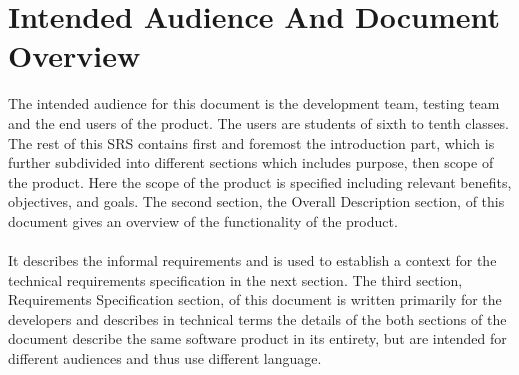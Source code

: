 \documentclass[12pt]{report}
\begin{document}
\section{Intended Audience And Document Overview}

The intended audience for this document is the development team, testing team and the end users of the product. The users are students of sixth to tenth classes. The rest of this SRS contains first and foremost the introduction part, which is further subdivided into different sections which includes purpose, then scope of the product. Here the scope of the product is specified including relevant benefits, objectives, and goals. The second section, the Overall Description section, of this document gives an overview of the functionality of the product. \\
\\
It describes the informal requirements and is used to establish a context for the technical requirements specification in the next section. The third section, Requirements Specification section, of this document is written primarily for the developers and describes in technical terms the details of the both sections of the document describe the same software product in its entirety, but are intended for different audiences and thus use different language.
\pagebreak
\end{document}
